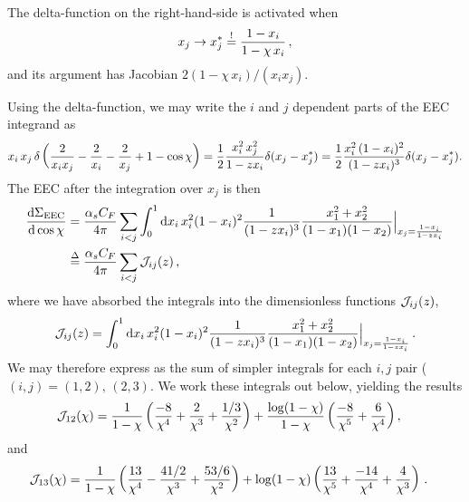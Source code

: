 The delta-function on the right-hand-side is activated when
\begin{align}
    x_j \to x_j^* \overset{!}{=} \frac{1-x_i}{1-\chi\,x_i}
    \,,
\end{align}
and its argument has Jacobian \(2(1 - \chi\,x_i)/(x_i x_j)\).

Using the delta-function, we may write the \(i\) and \(j\) dependent parts of the EEC integrand as
\begin{align}
    x_i\,x_j\,
    \delta\left(
        \frac{2}{x_i x_j} - \frac{2}{x_i} - \frac{2}{x_j} + 1
        -
        \cos\chi
    \right)
    =
    \frac{1}{2}
    \frac{x_i^2\,x_j^2}{1 - z x_i}
    \delta(x_j - x_j^*)
    =
    \frac{1}{2}
    \frac{x_i^2\,(1-x_i)^2}{(1 - z x_i)^3}
    \delta(x_j - x_j^*)
    .
\end{align}
%
The EEC after the integration over \(x_j\) is then
\begin{align}
    \dv{\Sigma_\text{EEC}}{\cos\chi}{}
    &=
    \frac{\alpha_s C_F}{4\pi}
    \sum_{i<j}
    \int_0^1 \dd x_i\,
    x_i^2 (1 - x_i)^2
    \frac{1}{(1- z x_i)^3}
    \frac{x_1^2 + x_2^2}{(1-x_1)(1-x_2)}
    \Big|_{x_j = \frac{1-x_i}{1-z x_i}}
    \\
    &
    \overset{\Delta}{=}
    \frac{\alpha_s C_F}{4\pi}
    \sum_{i<j}
    {\mathcal{J}}_{ij}(z)
    \,,
\end{align}
where we have absorbed the integrals into the dimensionless functions \(\mathcal{J}_{ij}(z)\),
\begin{align}
    {\mc J}_{ij}(z)
    =
    \int_0^1 \dd x_i\,
    x_i^2 (1 - x_i)^2
    \frac{1}{(1- z x_i)^3}
    \frac{x_1^2 + x_2^2}{(1-x_1)(1-x_2)}
    \Big|_{x_j = \frac{1-x_i}{1-z x_i}}
    \label{eq:eec_integrals}
    \,.
\end{align}
%
We may therefore express  as the sum of simpler integrals for each \(i, j\) pair (\((i, j) = (1,2),\,(2,3)\).
%
We work these integrals out below, yielding the results
\begin{align}
    \mathcal{J}_{12}(\chi)
    &=
   \frac{1}{1-\chi}
   \left(
    \frac{-8}{\chi^4} + \frac{2}{\chi^3} + \frac{1/3}{\chi^2}
   \right)
   +
   \frac{\log(1-\chi)}{1-\chi}
   \left(
    \frac{-8}{\chi^5} + \frac{6}{\chi^4}
   \right)
    ,
\end{align}
and
\begin{align}
    \mathcal{J}_{13}(\chi)
    &=
    \frac{1}{1-\chi} \left(
        \frac{13}{\chi^4}
        -
        \frac{41/2}{\chi^3}
        +
        \frac{53/6}{\chi^2}
    \right)
    +
    \log(1-\chi)\left(
        \frac{13}{\chi^5}
        +
        \frac{-14}{\chi^4}
        +
        \frac{4}{\chi^3}
    \right)
    \,.
\end{align}

